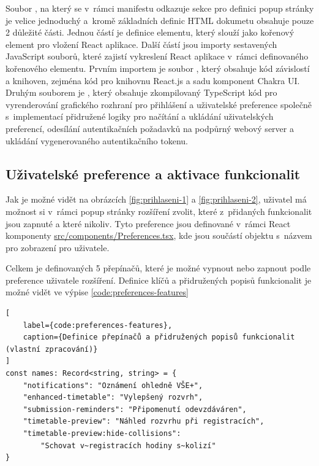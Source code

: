 
Soubor , na který se v~rámci manifestu odkazuje sekce pro definici popup stránky je velice jednoduchý a~kromě základních definic HTML dokumetu obsahuje pouze 2 důležité části. Jednou částí je definice  elementu, který slouží jako kořenový element pro vložení React aplikace. Další částí jsou importy sestavených JavaScript souborů, které zajistí vykreslení React aplikace v~rámci definovaného kořenového elementu. Prvním importem je soubor , který obsahuje kód závislostí a knihoven, zejména kód pro knihovnu React.js a sadu komponent Chakra UI. Druhým souborem je , který obsahuje zkompilovaný TypeScript kód pro vyrenderování grafického rozhraní pro přihlášení a uživatelské preference společně s~implementací přidružené logiky pro načítání a ukládání uživatelských preferencí, odesílání autentikačních požadavků na podpůrný webový server a ukládání vygenerovaného autentikačního tokenu.

\subsection{Uživatelské preference a aktivace funkcionalit}

Jak je možné vidět na obrázcích \ref{fig:prihlaseni-1} a \ref{fig:prihlaseni-2}, uživatel má možnost si v~rámci popup stránky rozšíření zvolit, které z~přidaných funkcionalit jsou zapnuté a které nikoliv. Tyto preference jsou definované v~rámci React komponenty \url{src/components/Preferences.tsx}, kde jsou součástí objektu s~názvem pro zobrazení pro uživatele.

Celkem je definovaných 5 přepínačů, které je možné vypnout nebo zapnout podle preference uživatele rozšíření. Definice klíčů a přidružených popisů funkcionalit je možné vidět ve výpise \ref{code:preferences-features}

\begin{lstlisting}[
    label={code:preferences-features},
    caption={Definice přepínačů a přidružených popisů funkcionalit (vlastní zpracování)}
]
const names: Record<string, string> = {
    "notifications": "Oznámení ohledně VŠE+",
    "enhanced-timetable": "Vylepšený rozvrh",
    "submission-reminders": "Připomenutí odevzdáváren",
    "timetable-preview": "Náhled rozvrhu při registracích",
    "timetable-preview:hide-collisions":
        "Schovat v~registracích hodiny s~kolizí"
}
\end{lstlisting}


